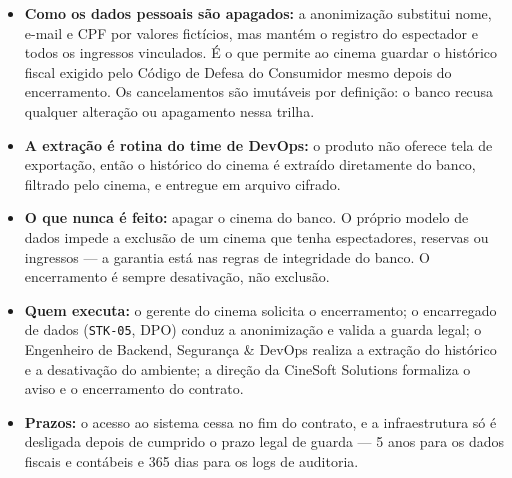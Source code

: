 \begin{itemize}
\item \textbf{Como os dados pessoais são apagados:} a anonimização substitui nome, e-mail e CPF por valores fictícios, mas mantém o registro do espectador e todos os ingressos vinculados. É o que permite ao cinema guardar o histórico fiscal exigido pelo Código de Defesa do Consumidor mesmo depois do encerramento. Os cancelamentos são imutáveis por definição: o banco recusa qualquer alteração ou apagamento nessa trilha.
\item \textbf{A extração é rotina do time de DevOps:} o produto não oferece tela de exportação, então o histórico do cinema é extraído diretamente do banco, filtrado pelo cinema, e entregue em arquivo cifrado.
\item \textbf{O que nunca é feito:} apagar o cinema do banco. O próprio modelo de dados impede a exclusão de um cinema que tenha espectadores, reservas ou ingressos — a garantia está nas regras de integridade do banco. O encerramento é sempre desativação, não exclusão.
\item \textbf{Quem executa:} o gerente do cinema solicita o encerramento; o encarregado de dados (\texttt{STK-05}, DPO) conduz a anonimização e valida a guarda legal; o Engenheiro de Backend, Segurança \& DevOps realiza a extração do histórico e a desativação do ambiente; a direção da CineSoft Solutions formaliza o aviso e o encerramento do contrato.
\item \textbf{Prazos:} o acesso ao sistema cessa no fim do contrato, e a infraestrutura só é desligada depois de cumprido o prazo legal de guarda — 5 anos para os dados fiscais e contábeis e 365 dias para os logs de auditoria.
\end{itemize}

